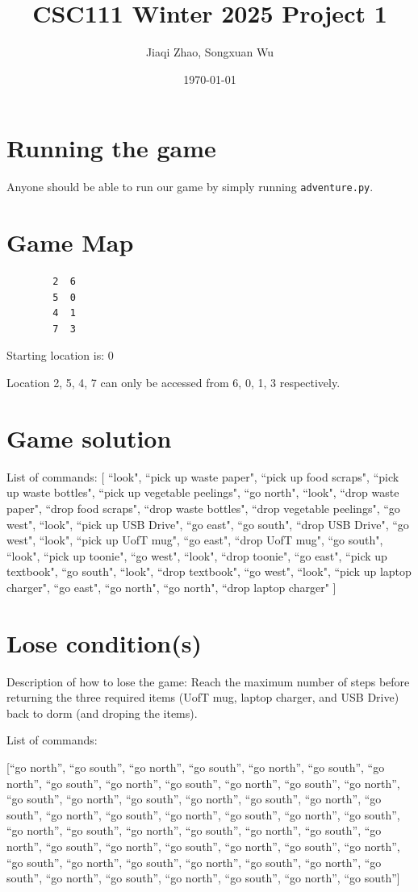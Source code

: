 \documentclass[11pt]{article}
\title{CSC111 Winter 2025 Project 1}
\author{Jiaqi Zhao, Songxuan Wu}
\date{\today}
\begin{document}
\maketitle

\section*{Running the game}
Anyone should be able to run our game by simply running \texttt{adventure.py}.

\section*{Game Map}

\begin{verbatim}
        2  6
        5  0
        4  1
        7  3
\end{verbatim}

Starting location is: 0

Location 2, 5, 4, 7 can only be accessed from 6, 0, 1, 3 respectively.

\section*{Game solution}
List of commands: [
        ``look", ``pick up waste paper", ``pick up food scraps", ``pick up waste bottles", ``pick up vegetable peelings", ``go north", ``look", ``drop waste paper", ``drop food scraps", ``drop waste bottles", ``drop vegetable peelings", ``go west", ``look", ``pick up USB Drive", ``go east", ``go south", ``drop USB Drive", ``go west", ``look", ``pick up UofT mug", ``go east", ``drop UofT mug", ``go south", ``look", ``pick up toonie", ``go west", ``look", ``drop toonie", ``go east", ``pick up textbook", ``go south", ``look", ``drop textbook", ``go west", ``look", ``pick up laptop charger", ``go east", ``go north", ``go north", ``drop laptop charger"
    ]

\section*{Lose condition(s)}
Description of how to lose the game: Reach the maximum number of steps before returning the three required items (UofT mug, laptop charger, and USB Drive) back to dorm (and droping the items).

List of commands:

[``go north'', ``go south'', ``go north'', ``go south'', ``go north'', ``go south'', ``go north'', ``go south'', ``go north'', ``go south'', ``go north'', ``go south'', ``go north'', ``go south'', ``go north'', ``go south'', ``go north'', ``go south'', ``go north'', ``go south'', ``go north'', ``go south'', ``go north'', ``go south'', ``go north'', ``go south'', ``go north'', ``go south'', ``go north'', ``go south'', ``go north'', ``go south'', ``go north'', ``go south'', ``go north'', ``go south'', ``go north'', ``go south'', ``go north'', ``go south'', ``go north'', ``go south'', ``go north'', ``go south'', ``go north'', ``go south'', ``go north'', ``go south'', ``go north'', ``go south'', ``go north'', ``go south'']
\end{document}
